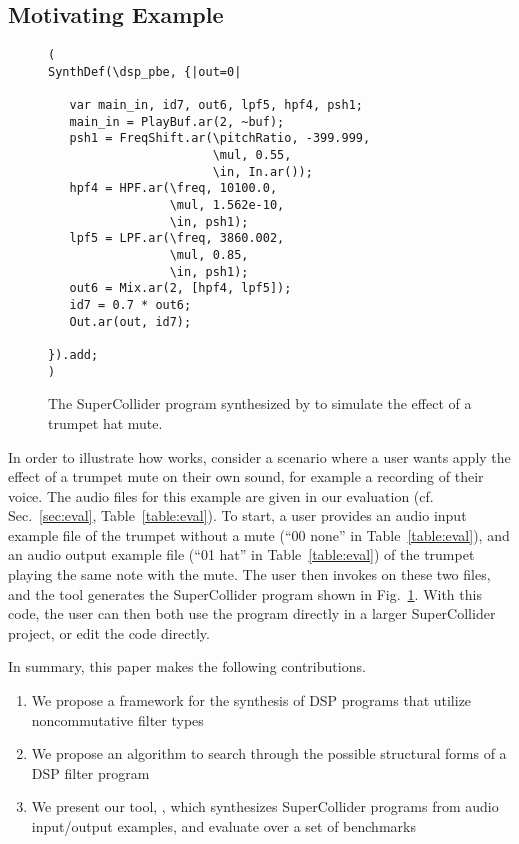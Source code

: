 \subsection{Motivating Example}


\begin{figure}
\begin{lstlisting}
( 
SynthDef(\dsp_pbe, {|out=0|

   var main_in, id7, out6, lpf5, hpf4, psh1;
   main_in = PlayBuf.ar(2, ~buf);
   psh1 = FreqShift.ar(\pitchRatio, -399.999, 
                       \mul, 0.55, 
                       \in, In.ar());
   hpf4 = HPF.ar(\freq, 10100.0, 
                 \mul, 1.562e-10, 
                 \in, psh1);
   lpf5 = LPF.ar(\freq, 3860.002, 
                 \mul, 0.85, 
                 \in, psh1);
   out6 = Mix.ar(2, [hpf4, lpf5]);
   id7 = 0.7 * out6;
   Out.ar(out, id7);

}).add;
)
\end{lstlisting}
\caption{The SuperCollider program synthesized by \ourTool to simulate the effect of a trumpet hat mute.}
\label{fig:sc_code}
\end{figure}

In order to illustrate how \ourTool works, consider a scenario where a user wants apply the effect of a trumpet mute on their own sound, for example a recording of their voice.
The audio files for this example are given in our evaluation (cf. Sec.~\ref{sec:eval}, Table~\ref{table:eval}).
To start, a user provides an audio input example file of the trumpet without a mute (``00 none'' in Table~\ref{table:eval}), and an audio output example file (``01 hat'' in Table~\ref{table:eval}) of the trumpet playing the same note with the mute.
The user then invokes \ourTool on these two files, and the tool generates the SuperCollider program shown in Fig.~\ref{fig:sc_code}.
With this code, the user can then both use the program directly in a larger SuperCollider project, or edit the code directly.

In summary, this paper makes the following contributions.

\begin{enumerate}
\item We propose a framework for the synthesis of DSP programs that utilize noncommutative filter types 
\item We propose an algorithm to search through the possible structural forms of a DSP filter program
\item We present our tool, \ourTool, which synthesizes SuperCollider programs from audio input/output examples, and evaluate \ourTool over a set of benchmarks
\end{enumerate}


